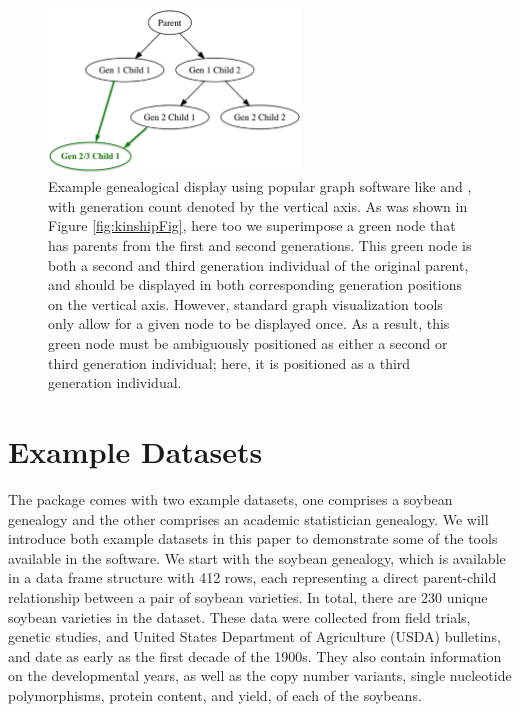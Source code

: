 \documentclass[article,shortnames]{jss}
\begin{document}
\begin{figure}[h]
    \centering
    \includegraphics[width=0.6\textwidth]{Graph}
    \caption{Example genealogical display using popular graph software like  and , with generation count denoted by the vertical axis. As was shown in Figure \ref{fig:kinshipFig}, here too we superimpose a green node that has parents from the first and second generations. This green node is both a second and third generation individual of the original parent, and should be displayed in both corresponding generation positions on the vertical axis. However, standard graph visualization tools only allow for a given node to be displayed once. As a result, this green node must be ambiguously positioned as either a second or third generation individual; here, it is positioned as a third generation individual.}
    \label{fig:Graph}
\end{figure}

\section{Example Datasets}

The  package comes with two example datasets, one comprises a soybean genealogy and the other comprises an academic statistician genealogy. We will introduce both example datasets in this paper to demonstrate some of the tools available in the software. We start with the soybean genealogy, which is available in a data frame structure with 412 rows, each representing a direct parent-child relationship between a pair of soybean varieties. In total, there are 230 unique soybean varieties in the dataset. These data were collected from field trials, genetic studies, and United States Department of Agriculture (USDA) bulletins, and date as early as the first decade of the 1900s. They also contain information on the developmental years, as well as the copy number variants, single nucleotide polymorphisms, protein content, and yield, of each of the soybeans.
\end{document}
